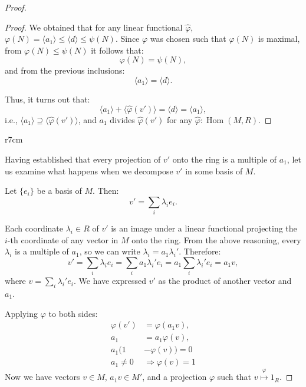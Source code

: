 \documentclass{article}
\newif\ifusemulticols
\newif\ifmobileview
\theoremstyle{definition}
\theoremstyle{remark}
\theoremstyle{plain}
\theoremstyle{plain}
\newenvironment{mymulticols}
    { \ifusemulticols \begin{multicols}{2} \fi }
    { \ifusemulticols \end{multicols} \fi }
\newcommand\mywrapbegin[3]{\ifmobileview\else\begin{wrapfigure}[#1]{#2}{#3}\fi}
\newcommand\mywrapend{\ifmobileview\else\end{wrapfigure}\fi}
\DeclareMathOperator{\Hom}{Hom}
\begin{document}
\begin{mymulticols}
\begin{proof}
\begin{proof}
\begin{minipage}[t]{\linewidth}
        \end{minipage}

        We obtained that for any linear functional 
        $\widehat \varphi$, $\varphi(N) = \langle a_1 \rangle \le \langle d \rangle \le \psi(N)$. 
        Since $\varphi$ was chosen such that $\varphi(N)$ is maximal,
        from $\varphi(N) \le \psi(N)$ it follows that: $$\varphi(N) = \psi(N),$$
        and from the previous inclusions: $$\langle a_1 \rangle = \langle d \rangle.$$

        Thus, it turns out that:
        $$\langle a_1 \rangle + \langle \widehat{\varphi}(v') \rangle = \langle d \rangle = \langle a_1 \rangle,$$
        i.e., $\langle a_1 \rangle \supseteq \langle \widehat{\varphi}(v') \rangle$, and $a_1$ divides $\widehat{\varphi}(v')$ for any $\widehat{\varphi} : \Hom(M, R)$.

    \end{proof}

    \begin{minipage}[t]{\linewidth}
        \mywrapbegin{10}{r}{7cm}
        \mywrapend

        Having established that every projection of $v'$ onto the ring is a multiple of $a_1$, let us
        examine what happens when we decompose $v'$ in some basis of $M$.

        Let $\{ e_i \}$ be a basis of $M$. Then: $$v' = \sum_i \lambda_i e_i.$$

        Each coordinate $\lambda_i \in R$ of $v'$ is an image under a linear functional projecting the
        $i$-th coordinate of any vector in $M$ onto the ring.
        From the above reasoning, every $\lambda_i$ is a multiple of $a_1$, so we can write $\lambda_i =
        a_1 \lambda_i'$. Therefore: $$v' = \sum_i \lambda_i e_i = \sum_i a_1 \lambda_i' e_i = a_1 \sum_i
        \lambda_i' e_i = a_1 v,$$ 
        where $v = \sum_i \lambda_i' e_i$. 
        We have expressed $v'$ as the product of another vector and $a_1$.
    \end{minipage}

    Applying $\varphi$ to both sides:
    \begin{align*}
        \varphi(v') &= \varphi(a_1 v), \\
        a_1 &= a_1 \varphi(v), \\
        a_1 ( 1 &- \varphi(v) ) = 0\\
        a_1 \neq 0 &\Rightarrow \varphi(v) = 1
    \end{align*} %
    Now we have vectors $v \in M$, $a_1 v \in M'$, and a projection $\varphi$ such that $v
    \stackrel{\varphi}{\mapsto} 1_R$.


\end{proof}
\end{mymulticols}
\end{document}
